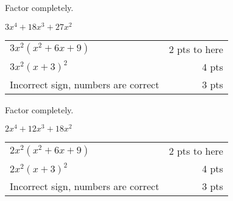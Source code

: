 {
	Factor completely.\par
	$3x^4+18x^3+27x^2$
}
{
	\begin{tabular}{l r}
	$3x^2(x^2+6x+9)$ & 2 pts to here\\
	$3x^2(x+3)^2$ & 4 pts\\
	Incorrect sign, numbers are correct &3 pts
	\end{tabular}
}

{
	Factor completely.\par
	$2x^4+12x^3+18x^2$
}
{
	\begin{tabular}{l r}
	$2x^2(x^2+6x+9)$ & 2 pts to here\\
	$2x^2(x+3)^2$ & 4 pts\\
	Incorrect sign, numbers are correct &3 pts
	\end{tabular}
}
